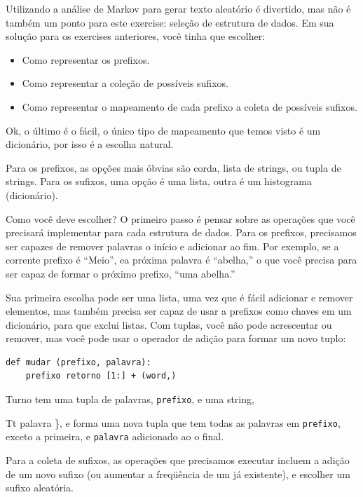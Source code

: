 \documentclass[10pt]{book}
\begin{document}
\begin{exercise}
\begin{v erbatim}
Utilizando a análise de Markov para gerar texto aleatório é divertido, mas não é
também um ponto para este exercise: seleção de estrutura de dados. Em sua
solução para os exercises anteriores, você tinha que escolher:

\begin{itemize}

\item Como representar os prefixos.

\item Como representar a coleção de possíveis sufixos.

\item Como representar o mapeamento de cada prefixo
a coleta de possíveis sufixos.

\end{itemize}

Ok, o último é o fácil, o único tipo de mapeamento que temos
visto é um dicionário, por isso é a escolha natural.

Para os prefixos, as opções mais óbvias são corda,
lista de strings, ou tupla de strings. Para os sufixos,
uma opção é uma lista, outra é um histograma (dicionário).

Como você deve escolher? O primeiro passo é pensar sobre
as operações que você precisará implementar para cada estrutura de dados.
Para os prefixos, precisamos ser capazes de remover palavras
o início e adicionar ao fim. Por exemplo, se a corrente
prefixo é ``Meio'', ea próxima palavra é ``abelha,'' o que você precisa
para ser capaz de formar o próximo prefixo, ``uma abelha.''

Sua primeira escolha pode ser uma lista, uma vez que é fácil adicionar
e remover elementos, mas também precisa ser capaz de usar a
prefixos como chaves em um dicionário, para que exclui listas.
Com tuplas, você não pode acrescentar ou remover, mas você pode usar
o operador de adição para formar um novo tuplo:

\begin{verbatim}
def mudar (prefixo, palavra):
    prefixo retorno [1:] + (word,)
\end{verbatim}
%
{Turno \tt} tem uma tupla de palavras, {\tt prefixo}, e uma string, 
{Tt palavra \}, e forma uma nova tupla que tem todas as palavras
em {\tt prefixo}, exceto a primeira, e {\tt palavra} adicionado ao
o final.

Para a coleta de sufixos, as operações que precisamos
executar incluem a adição de um novo sufixo (ou aumentar a freqüência
de um já existente), e escolher um sufixo aleatória.

}
\end{v erbatim}
\end{exercise}
\end{document}
